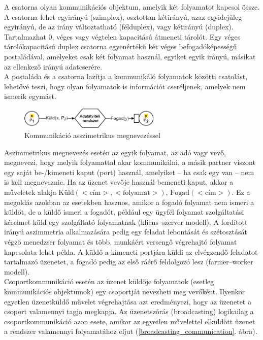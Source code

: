 \documentclass[tikz,12pt,margin=0px]{article}
\begin{document}
    \noindent A csatorna olyan kommunikációs objektum, amelyik két folyamatot kapcsol össze. A csatorna lehet egyirányú (szimplex), osztottan kétirányú, azaz egyidejűleg egyirányú, de az irány változtatható (félduplex), vagy kétirányú (duplex). Tartalmazhat 0, véges vagy végtelen kapacitású átmeneti tárolót. Egy véges tárolókapacitású duplex csatorna egyenértékű két véges befogadóképességű postaládával, amelyeket csak két folyamat használ, egyiket egyik irányú, másikat az ellenkező irányú adatcserére.\\

    \noindent A postaláda és a csatorna lazítja a kommunikáló folyamatok közötti csatolást, lehetővé teszi, hogy olyan folyamatok is információt cseréljenek, amelyek nem ismerik egymást.

    \begin{figure}[H]
        \centering
        \includegraphics[width=0.6\textwidth]{img/asymmetric_communication.png}
        \caption{Kommunikáció asszimetrikus megnevezéssel}
        \label{asymmetric_communication}
    \end{figure}

    \noindent Aszimmetrikus megnevezés esetén az egyik folyamat, az adó vagy vevő, megnevezi, hogy melyik folyamattal akar kommunikálni, a másik partner viszont egy saját be-/kimeneti kaput (port) használ, amelyiket – ha csak egy van – nem is kell megneveznie. Ha az üzenet vevője használ bemeneti kaput, akkor a műveletek alakja $\text{Küld}(<\text{cím}>,<\text{folyamat}>)$, $\text{Fogad}(<\text{cím}>)$. Ez a megoldás azokban az esetekben hasznos, amikor a fogadó folyamat nem ismeri a küldőt, de a küldő ismeri a fogadót, például egy ügyfél folyamat szolgáltatási kérelmet küld egy szolgáltató folyamatnak (kliens–szerver modell). A fordított irányú aszimmetria alkalmazására pedig egy feladat lebontását és szétosztását végző menedzser folyamat és több, munkáért versengő végrehajtó folyamat kapcsolata lehet példa. A küldő a kimeneti port­jára küldi az elvégzendő feladatot tartalmazó üzenetet, a fogadó pedig az első ráérő feldolgozó lesz (farmer–worker modell).\\

    \noindent Csoportkommunikáció esetén az üzenet küldője folyamatok (esetleg kommunikációs objektumok) egy csoportját nevezheti meg vevőként. Ilyenkor egyetlen üzenetküldő művelet végrehajtása azt eredményezi, hogy az üzenetet a csoport valamennyi tagja megkapja. Az üzenetszórás (broadcasting) logikailag a csoportkommunikáció azon esete, amikor az egyetlen művelettel elküldött üzenet a rendszer valamennyi folyamatához eljut (\ref{broadcasting_communication}. ábra).\\
\end{document}
